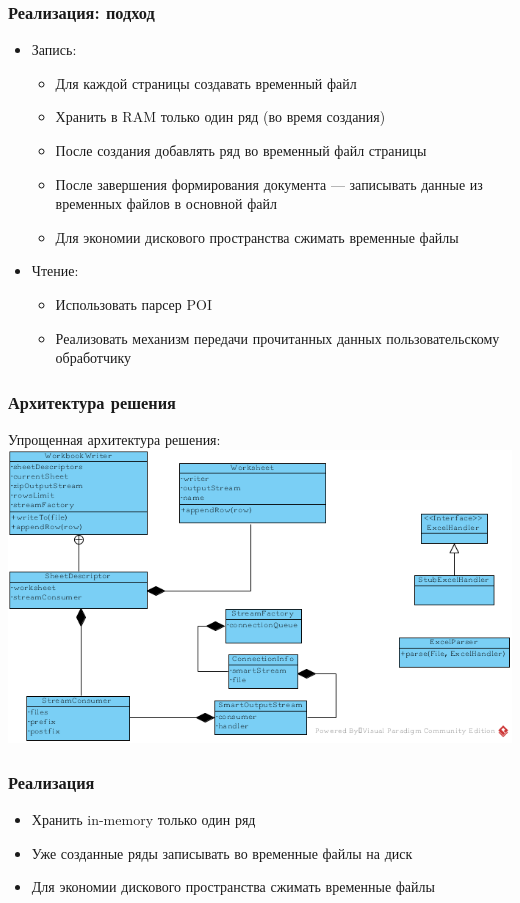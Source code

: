 \documentclass{beamer}
\begin{document}
\begin{frame}\frametitle{Реализация: подход}
\begin{itemize}
    \item Запись:
    \begin{itemize}
        \item Для каждой страницы создавать временный файл
        \item Хранить в RAM только один ряд (во время создания)
        \item После создания добавлять ряд во временный файл страницы
        \item После завершения формирования документа --- записывать данные из временных файлов в основной файл
        \item Для экономии дискового пространства сжимать временные файлы
    \end{itemize}
    \item Чтение:
    \begin{itemize}
        \item Использовать парсер POI
        \item Реализовать механизм передачи прочитанных данных пользовательскому обработчику
    \end{itemize}
\end{itemize}
\end{frame}

\begin{frame}
  \transwipe[direction=90]
  \frametitle{Архитектура решения}
  Упрощенная архитектура решения:
  \includegraphics[width=\textwidth,height=\textheight,keepaspectratio]{arc.png}
\end{frame}

\begin{frame}\frametitle{Реализация}
\begin{itemize}
    \item Хранить in-memory только один ряд
    \item Уже созданные ряды записывать во временные файлы на диск
    \item Для экономии дискового пространства сжимать временные файлы
\end{itemize}
\end{frame}
\end{document}
